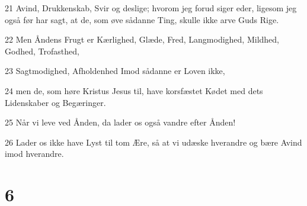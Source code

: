 \par 21 Avind, Drukkenskab, Svir og deslige; hvorom jeg forud siger eder, ligesom jeg også før har sagt, at de, som øve sådanne Ting, skulle ikke arve Guds Rige.
\par 22 Men Åndens Frugt er Kærlighed, Glæde, Fred, Langmodighed, Mildhed, Godhed, Trofasthed,
\par 23 Sagtmodighed, Afholdenhed Imod sådanne er Loven ikke,
\par 24 men de, som høre Kristus Jesus til, have korsfæstet Kødet med dets Lidenskaber og Begæringer.
\par 25 Når vi leve ved Ånden, da lader os også vandre efter Ånden!
\par 26 Lader os ikke have Lyst til tom Ære, så at vi udæske hverandre og bære Avind imod hverandre.

\chapter{6}

